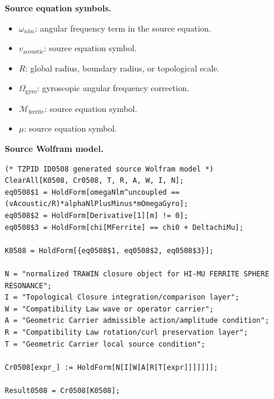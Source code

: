 \begin{minipage}[t]{0.49\linewidth}
\begingroup
\small
\raggedright
\textbf{Source equation symbols.}\par
\begin{itemize}[leftmargin=1.35em,itemsep=1pt,topsep=1pt,parsep=0pt]
    \item $\omega_{nlm}$: angular frequency term in the source equation.
    \item $v_{\mathrm{acoustic}}$: source equation symbol.
    \item $R$: global radius, boundary radius, or topological scale.
    \item $\Omega_{\mathrm{gyro}}$: gyroscopic angular frequency correction.
    \item $\mathcal{M}_{\mathrm{ferrite}}$: source equation symbol.
    \item $\mu$: source equation symbol.
\end{itemize}
\endgroup
\end{minipage}\hfill
\begin{minipage}[t]{0.47\linewidth}
\begingroup
\scriptsize
\raggedright
\textbf{Source Wolfram model.}\par
\begin{Verbatim}[fontsize=\tiny,breaklines=true,breakanywhere=true]
(* TZPID ID0508 generated source Wolfram model *)
ClearAll[K0508, Cr0508, T, R, A, W, I, N];
eq0508$1 = HoldForm[omegaNlm^uncoupled == (vAcoustic/R)*alphaNlPlusMinus*mOmegaGyro];
eq0508$2 = HoldForm[Derivative[1][m] != 0];
eq0508$3 = HoldForm[chi[MFerrite] == chi0 + DeltachiMu];

K0508 = HoldForm[{eq0508$1, eq0508$2, eq0508$3}];

N = "normalized TRAWIN closure object for HI-MU FERRITE SPHERE RESONANCE";
I = "Topological Closure integration/comparison layer";
W = "Compatibility Law wave or operator carrier";
A = "Geometric Carrier admissible action/amplitude condition";
R = "Compatibility Law rotation/curl preservation layer";
T = "Geometric Carrier local source condition";

Cr0508[expr_] := HoldForm[N[I[W[A[R[T[expr]]]]]]];

Result0508 = Cr0508[K0508];
\end{Verbatim}
\endgroup
\end{minipage}

